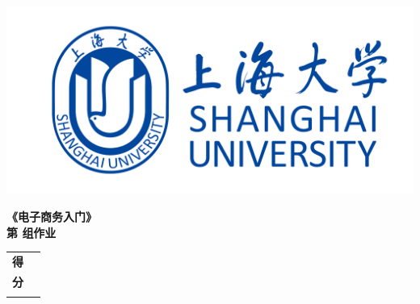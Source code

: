 
\begin{titlepage}
\noindent
\begin{minipage}[c]{0.2\textwidth}
    \centering
    \includegraphics[width=1.5\textwidth]{imgs/shulogo.png} \\
\end{minipage}
\hfill
\begin{minipage}[c]{0.55\textwidth}
    \centering
    \textbf{\fontsize{15pt}{15pt}\selectfont 《电子商务入门》} \\[0.2cm]
    \textbf{\fontsize{15pt}{15pt}\selectfont 第 \underline{} 组作业}
\end{minipage}
\hfill
\begin{minipage}[c]{0.2\textwidth}
    \centering
    \begin{tabular}{||p{1.2cm}||p{1.2cm}||}
        \hhline{|t:=:t:=:t|}
        \centering \vfill \textbf{\large 得} & \rule{0pt}{0.5cm} \\
        \centering \textbf{\large 分} \vfill & \rule{0pt}{0.5cm} \\ 
        \hhline{|b:=:b:=:b|}
    \end{tabular}
\end{minipage}
\hfill
\vspace*{1cm}
\begin{table}[h]
    \centering
    \renewcommand\arraystretch{1.15}
\end{table}
\end{titlepage}
